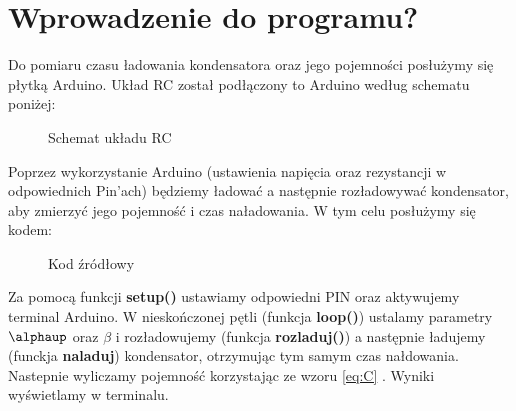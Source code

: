 \documentclass[12pt]{mwrep}
\let\alpha\alphaup
\begin{document}
	
	
	
	
	
	
	
	
	\section{Wprowadzenie do programu?}%
	\noindent Do pomiaru czasu ładowania kondensatora oraz jego pojemności posłużymy się płytką Arduino. Układ RC został podłączony to Arduino według schematu poniżej:\\
	
	\begin{figure}[H]\caption{Schemat układu RC\textsuperscript{\cite{RC}}}
	\end{figure}
	Poprzez wykorzystanie Arduino (ustawienia napięcia oraz rezystancji w odpowiednich Pin'ach) będziemy ładować a następnie rozładowywać kondensator, aby zmierzyć jego pojemność i czas naładowania. W tym celu posłużymy się kodem:
	
	\begin{figure}[H]\caption{Kod źródłowy\textsuperscript{\cite{code}}}
		\centering
		\begin{minipage}{.5\textwidth}
			\centering
		\end{minipage}%
		\begin{minipage}{.5\textwidth}
			\centering
		\end{minipage}
	\end{figure}
	Za pomocą funkcji \textbf{setup()} ustawiamy odpowiedni PIN  oraz aktywujemy terminal Arduino. W nieskończonej pętli (funkcja \textbf{loop()})  ustalamy parametry $\alpha$ oraz $\beta$ i rozładowujemy (funkcja \textbf{rozladuj()}) a następnie ładujemy (funckja \textbf{naladuj}) kondensator, otrzymując tym samym czas nałdowania. Nastepnie wyliczamy pojemność korzystając ze wzoru \eqref{eq:C} . Wyniki wyświetlamy w terminalu.
	
	
\end{document}
